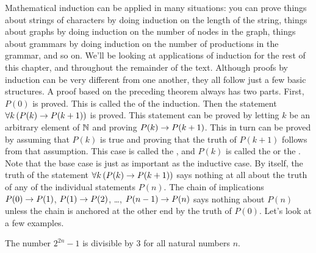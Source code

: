 Mathematical induction can be applied in many situations:
you can prove things about strings of characters by doing induction on the
length of the string, things about graphs by doing induction on the
number of nodes in the graph, things about grammars by doing induction on
the number of productions in the grammar, and so on. We'll
be looking at applications of induction for the rest of this chapter,
and throughout the remainder of the text.
Although proofs by induction can be very different from one
another, they all follow just a few basic structures.  A proof based
on the preceding theorem always has two parts.  First, $P(0)$
is proved.  This is called the  of the induction.
Then the statement $\forall k\,(P(k)\rightarrow P(k+1))$ is proved.
This statement can be proved by letting $k$ be an arbitrary
element of ${\mathbb N}$ and proving $P(k)\rightarrow P(k+1)$.  This in turn can
be proved by assuming that $P(k)$ is true and proving that
the truth of $P(k+1)$ follows from that assumption.  This case is called
the , and $P(k)$ is called the  or
the .
Note that the base case is just as important
as the inductive case.  By itself, the truth of the statement $\forall k\,(P(k)\rightarrow P(k+1))$
says nothing at all about the truth of any of the individual statements $P(n)$.
The chain of implications $P(0)\rightarrow P(1)$, $P(1)\rightarrow P(2)$, \dots, 
$P(n-1)\rightarrow P(n)$ says nothing about $P(n)$ unless the chain is
anchored at the other end by the truth of $P(0)$.  Let's look
at a few examples.

\begin{theorem}
The number $2^{2n}-1$ is divisible by 3 for all natural numbers $n$.
\end{theorem}

